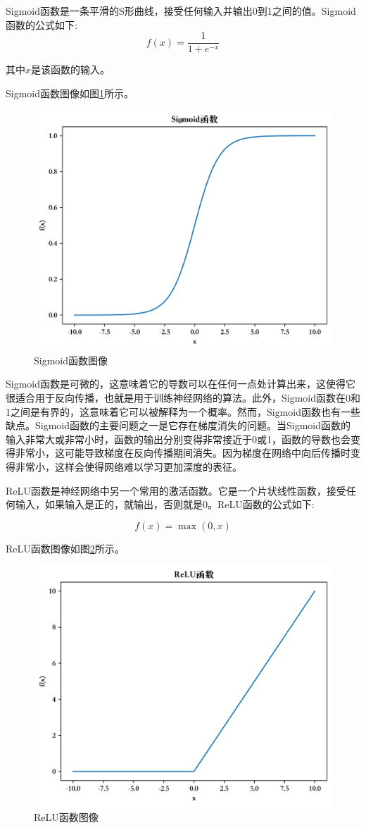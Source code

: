 Sigmoid函数是一条平滑的S形曲线，接受任何输入并输出0到1之间的值。Sigmoid函数的公式如下:
\begin{equation}
\label{eq:2_15}
f(x) = \frac{1} {1 + e^{-x}}
\end{equation}


其中$x$是该函数的输入。

Sigmoid函数图像如图\ref{Sigmoid}所示。
\begin{figure}[htbp]
  \centering
  \includegraphics[width=.5\linewidth]{figures/content/sigmoid.png}
  \caption{Sigmoid函数图像}
  \label{Sigmoid}
\end{figure}


Sigmoid函数是可微的，这意味着它的导数可以在任何一点处计算出来，这使得它很适合用于反向传播，也就是用于训练神经网络的算法。此外，Sigmoid函数在0和1之间是有界的，这意味着它可以被解释为一个概率。然而，Sigmoid函数也有一些缺点。Sigmoid函数的主要问题之一是它存在梯度消失的问题。当Sigmoid函数的输入非常大或非常小时，函数的输出分别变得非常接近于0或1，函数的导数也会变得非常小，这可能导致梯度在反向传播期间消失。因为梯度在网络中向后传播时变得非常小，这样会使得网络难以学习更加深度的表征。


ReLU函数是神经网络中另一个常用的激活函数。它是一个片状线性函数，接受任何输入，如果输入是正的，就输出，否则就是0。ReLU函数的公式如下:

\begin{equation}
\label{eq:2_16}
f(x) = \max(0, x)
\end{equation}

ReLU函数图像如图\ref{ReLU}所示。
\begin{figure}[htbp]
  \centering
  \includegraphics[width=.5\linewidth]{figures/content/ReLU.png}
  \caption{ReLU函数图像}
  \label{ReLU}
\end{figure}

